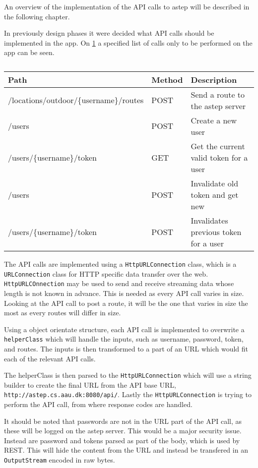 An overview of the implementation of the API calls to \gls{astep} will be described in the following chapter.

In previously design phases it were decided what API calls should be implemented in the app.
On \ref{tab:asteprequests} a specified list of calls only to be performed on the app can be seen.

\begin{table}[h]
	\centering
	\scriptsize
	\begin{tabular}{l l l}
		Path & Method & Description\\\midrule
		/locations/outdoor/\{username\}/routes & POST & Send a route to the \gls{astep} server\\
		/users & POST & Create a new user\\
		/users/\{username\}/token & GET & Get the current valid token for a user\\
		/users & POST & Invalidate old token and get new\\
		/users/\{username\}/token & POST & Invalidates previous token for a user\\
	\end{tabular}
	\label{tab:asteprequests}
	\caption{}
\end{table} 

The API calls are implemented using a \texttt{HttpURLConnection} class, which is a \texttt{URLConnection} class for HTTP specific data transfer over the web.
 \texttt{HttpURLCOnnection} may be used to send and receive streaming data whose length is not known in advance.
 This is needed as every API call varies in size.
 Looking at the API call to post a route, it will be the one that varies in size the most as every routes will differ in size.



Using a object orientate structure, each API call is implemented to overwrite a \texttt{helperClass} which will handle the inputs, such as username, password, token, and routes.
The inputs is then transformed to a part of an URL which would fit each of the relevant API calls.

The helperClass is then parsed to the \texttt{HttpURLConnection} which will use a string builder to create the final URL from the API base URL, \texttt{http://astep.cs.aau.dk:8080/api/}.
Lastly the \texttt{HttpURLConnection} is trying to perform the API call, from where response codes are handled.

It should be noted that passwords are not in the URL part of the API call, as these will be logged on the \gls{astep} server. 
This would be a major security issue.
Instead are password and tokens parsed as part of the body, which is used by REST. 
This will hide the content from the URL and instead be transfered in an \texttt{OutputStream} encoded in raw bytes. 

